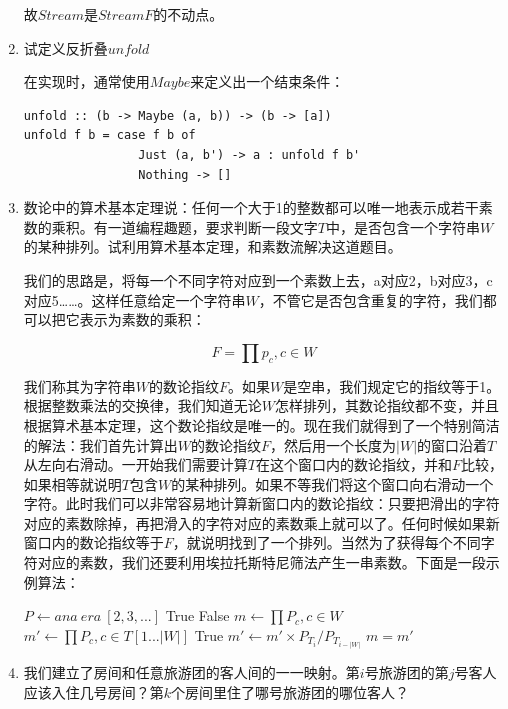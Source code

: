 \documentclass[UTF8]{article}
\begin{document}
\begin{enumerate}
故$Stream$是$StreamF$的不动点。

\item{试定义反折叠$unfold$}

在实现时，通常使用$Maybe$来定义出一个结束条件：
\begin{lstlisting}
unfold :: (b -> Maybe (a, b)) -> (b -> [a])
unfold f b = case f b of
                Just (a, b') -> a : unfold f b'
                Nothing -> []
\end{lstlisting}

\item 数论中的算术基本定理说：任何一个大于1的整数都可以唯一地表示成若干素数的乘积。有一道编程趣题，要求判断一段文字$T$中，是否包含一个字符串$W$的某种排列。试利用算术基本定理，和素数流解决这道题目。

我们的思路是，将每一个不同字符对应到一个素数上去，a对应2，b对应3，c对应5……。这样任意给定一个字符串$W$，不管它是否包含重复的字符，我们都可以把它表示为素数的乘积：

\[
F = \prod p_c , c \in W
\]

我们称其为字符串$W$的数论指纹$F$。如果$W$是空串，我们规定它的指纹等于1。根据整数乘法的交换律，我们知道无论$W$怎样排列，其数论指纹都不变，并且根据算术基本定理，这个数论指纹是唯一的。现在我们就得到了一个特别简洁的解法：我们首先计算出$W$的数论指纹$F$，然后用一个长度为$|W|$的窗口沿着$T$从左向右滑动。一开始我们需要计算$T$在这个窗口内的数论指纹，并和$F$比较，如果相等就说明$T$包含$W$的某种排列。如果不等我们将这个窗口向右滑动一个字符。此时我们可以非常容易地计算新窗口内的数论指纹：只要把滑出的字符对应的素数除掉，再把滑入的字符对应的素数乘上就可以了。任何时候如果新窗口内的数论指纹等于$F$，就说明找到了一个排列。当然为了获得每个不同字符对应的素数，我们还要利用埃拉托斯特尼筛法产生一串素数。下面是一段示例算法：

\begin{algorithmic}
  \State $P \gets ana \ era \ [2, 3, ...]$ 
    \State \Return True
  \EndIf
    \State \Return False
  \EndIf
  \State $\displaystyle m \gets \prod P_c, c \in W$
  \State $\displaystyle m' \gets \prod P_c, c \in T[1...|W|]$
      \State \Return True
    \EndIf
    \State $m' \gets m' \times P_{T_i} / P_{T_{i - |W|}} $
  \EndFor
  \State \Return $m = m'$
\EndFunction
\end{algorithmic}

\item{我们建立了房间和任意旅游团的客人间的一一映射。第$i$号旅游团的第$j$号客人应该入住几号房间？第$k$个房间里住了哪号旅游团的哪位客人？}


\end{enumerate}
\end{document}
